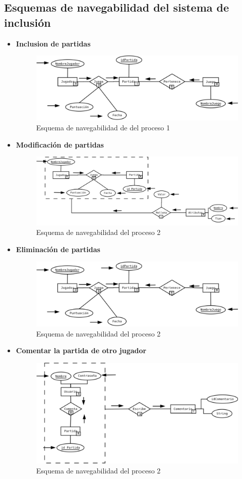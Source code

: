 \subsection{Esquemas de navegabilidad del sistema de inclusión}
\begin{itemize}
  \item \textbf{Inclusion de partidas}
  \begin{figure}[H]
    \centering
    \includegraphics[width=0.5\linewidth]{../Diagramas/pdf/IncluirPartida.pdf}
    \caption{Esquema de navegabilidad de del proceso 1}
  \end{figure}

  \item \textbf{Modificación de partidas}
  \begin{figure}[H]
    \centering
    \includegraphics[width=0.5\linewidth]{../Diagramas/pdf/ModificarPartida.pdf}
    \caption{Esquema de navegabilidad del proceso 2}
  \end{figure}

  \item \textbf{Eliminación de partidas}
  \begin{figure}[H]
    \centering
    \includegraphics[width=0.5\linewidth]{../Diagramas/pdf/EliminarRegistro.pdf}
    \caption{Esquema de navegabilidad del proceso 2}
  \end{figure}

  \item \textbf{Comentar la partida de otro jugador}
  \begin{figure}[H]
    \centering
    \includegraphics[width=0.5\linewidth]{../Diagramas/pdf/ComentarPartida.pdf}
    \caption{Esquema de navegabilidad del proceso 2}
  \end{figure}


\end{itemize}
